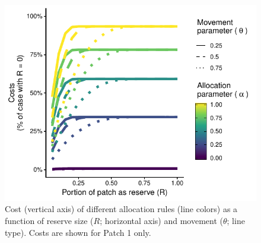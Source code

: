 \documentclass[12pt]{article}
\begin{document}
\begin{figure}[htbp]
\centering
\includegraphics{img/allocation_cost_plot.pdf}
\caption{\label{fig:allocation_cost_plot}Cost (vertical axis) of different allocation rules (line colors) as a function of reserve  size ($R$; horizontal axis) and movement ($\theta$; line type). Costs are shown for Patch 1 only.}
\end{figure}
\end{document}
